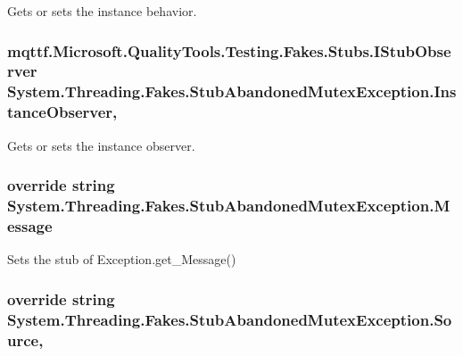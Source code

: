 Gets or sets the instance behavior.

\hypertarget{class_system_1_1_threading_1_1_fakes_1_1_stub_abandoned_mutex_exception_ab2bb856c53eab41348bb83782c1e2d52}{
\subsubsection[{Instance\-Observer}]{\setlength{\rightskip}{0pt plus 5cm}mqttf.\-Microsoft.\-Quality\-Tools.\-Testing.\-Fakes.\-Stubs.\-I\-Stub\-Observer System.\-Threading.\-Fakes.\-Stub\-Abandoned\-Mutex\-Exception.\-Instance\-Observer\hspace{0.3cm}{\ttfamily [get]}, {\ttfamily [set]}}}\label{class_system_1_1_threading_1_1_fakes_1_1_stub_abandoned_mutex_exception_ab2bb856c53eab41348bb83782c1e2d52}


Gets or sets the instance observer.

\hypertarget{class_system_1_1_threading_1_1_fakes_1_1_stub_abandoned_mutex_exception_a0d5e6637cdb4b44b7f67678c9181e0d9}{
\subsubsection[{Message}]{\setlength{\rightskip}{0pt plus 5cm}override string System.\-Threading.\-Fakes.\-Stub\-Abandoned\-Mutex\-Exception.\-Message\hspace{0.3cm}{\ttfamily [get]}}}\label{class_system_1_1_threading_1_1_fakes_1_1_stub_abandoned_mutex_exception_a0d5e6637cdb4b44b7f67678c9181e0d9}


Sets the stub of Exception.\-get\-\_\-\-Message()

\hypertarget{class_system_1_1_threading_1_1_fakes_1_1_stub_abandoned_mutex_exception_ad3befedffe22f6a684db8bb0bca84ba6}{
\subsubsection[{Source}]{\setlength{\rightskip}{0pt plus 5cm}override string System.\-Threading.\-Fakes.\-Stub\-Abandoned\-Mutex\-Exception.\-Source\hspace{0.3cm}{\ttfamily [get]}, {\ttfamily [set]}}}\label{class_system_1_1_threading_1_1_fakes_1_1_stub_abandoned_mutex_exception_ad3befedffe22f6a684db8bb0bca84ba6}


